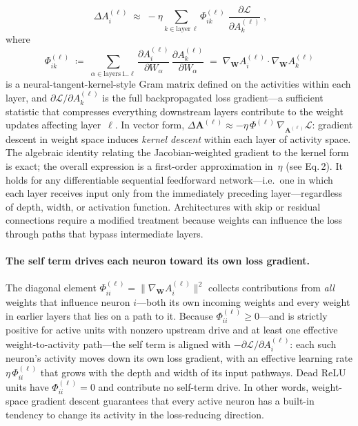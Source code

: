 \documentclass[10pt]{article}
\newcommand{\vW}{\mathbf{W}}
\newcommand{\vA}{\mathbf{A}}
\newcommand{\grad}{\nabla_{\!\vW}}
\newcommand{\loss}{\mathcal{L}}
\begin{document}
%
\begin{equation}\label{eq:main}
  \boxed{\;\Delta A_i^{(\ell)} \;\approx\; -\eta \sum_{k\in\text{layer}\,\ell} \Phi^{(\ell)}_{ik}\;\frac{\partial \loss}{\partial A_k^{(\ell)}}\;,}
\end{equation}
%
where
%
\begin{equation}\label{eq:kernel}
  \Phi^{(\ell)}_{ik}
  \;\coloneqq\; \sum_{\alpha\in\text{layers}\,1..\ell} \frac{\partial A_i^{(\ell)}}{\partial W_\alpha}\,\frac{\partial A_k^{(\ell)}}{\partial W_\alpha}
  \;=\; \grad A_i^{(\ell)} \cdot \grad A_k^{(\ell)}
\end{equation}
%
is a neural-tangent-kernel-style Gram matrix defined on the activities within each layer, and $\partial \loss/\partial A_k^{(\ell)}$ is the full backpropagated loss gradient---a sufficient statistic that compresses everything downstream layers contribute to the weight updates affecting layer~$\ell$.  In vector form, $\Delta\vA^{(\ell)} \approx -\eta\,\Phi^{(\ell)}\,\nabla_{\!\vA^{(\ell)}}\loss$: gradient descent in weight space induces \emph{kernel descent} within each layer of activity space.  The algebraic identity relating the Jacobian-weighted gradient to the kernel form is exact; the overall expression is a first-order approximation in~$\eta$ (see Eq.\,2).  It holds for any differentiable sequential feedforward network---i.e.\ one in which each layer receives input only from the immediately preceding layer---regardless of depth, width, or activation function.  Architectures with skip or residual connections require a modified treatment because weights can influence the loss through paths that bypass intermediate layers.

\paragraph{The self term drives each neuron toward its own loss gradient.}
The diagonal element $\Phi^{(\ell)}_{ii}=\lVert\grad A_i^{(\ell)}\rVert^2$ collects contributions from \emph{all} weights that influence neuron $i$---both its own incoming weights and every weight in earlier layers that lies on a path to it.  Because $\Phi^{(\ell)}_{ii}\ge 0$---and is strictly positive for active units with nonzero upstream drive and at least one effective weight-to-activity path---the self term is aligned with $-\partial \loss/\partial A_i^{(\ell)}$: each such neuron's activity moves down its own loss gradient, with an effective learning rate $\eta\,\Phi^{(\ell)}_{ii}$ that grows with the depth and width of its input pathways.  Dead ReLU units have $\Phi^{(\ell)}_{ii}=0$ and contribute no self-term drive.  In other words, weight-space gradient descent guarantees that every active neuron has a built-in tendency to change its activity in the loss-reducing direction.
\end{document}
